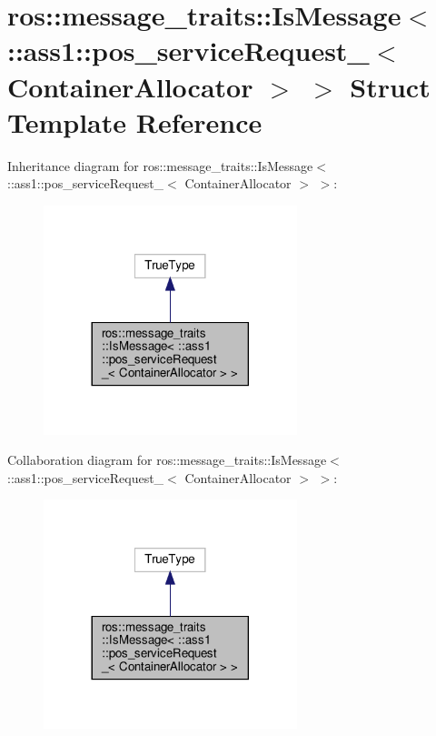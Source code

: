 \hypertarget{structros_1_1message__traits_1_1IsMessage_3_01_1_1ass1_1_1pos__serviceRequest___3_01ContainerAllocator_01_4_01_4}{}\section{ros\+:\+:message\+\_\+traits\+:\+:Is\+Message$<$ \+:\+:ass1\+:\+:pos\+\_\+service\+Request\+\_\+$<$ Container\+Allocator $>$ $>$ Struct Template Reference}
\label{structros_1_1message__traits_1_1IsMessage_3_01_1_1ass1_1_1pos__serviceRequest___3_01ContainerAllocator_01_4_01_4}


Inheritance diagram for ros\+:\+:message\+\_\+traits\+:\+:Is\+Message$<$ \+:\+:ass1\+:\+:pos\+\_\+service\+Request\+\_\+$<$ Container\+Allocator $>$ $>$\+:
\nopagebreak
\begin{figure}[H]
\begin{center}
\leavevmode
\includegraphics[width=209pt]{structros_1_1message__traits_1_1IsMessage_3_01_1_1ass1_1_1pos__serviceRequest___3_01ContainerAlle9a58810825fc12cfc674c6782415150}
\end{center}
\end{figure}


Collaboration diagram for ros\+:\+:message\+\_\+traits\+:\+:Is\+Message$<$ \+:\+:ass1\+:\+:pos\+\_\+service\+Request\+\_\+$<$ Container\+Allocator $>$ $>$\+:
\nopagebreak
\begin{figure}[H]
\begin{center}
\leavevmode
\includegraphics[width=209pt]{structros_1_1message__traits_1_1IsMessage_3_01_1_1ass1_1_1pos__serviceRequest___3_01ContainerAllocator_01_4_01_4__coll__graph}
\end{center}
\end{figure}



